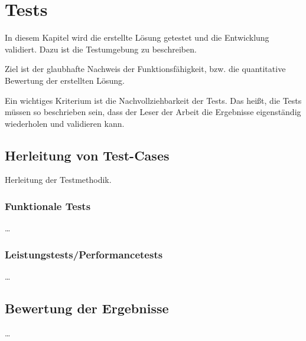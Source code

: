 
\chapter{Tests} \label{Tests}

In diesem Kapitel wird die erstellte Lösung getestet und die Entwicklung validiert.
Dazu ist die Testumgebung zu beschreiben. 

Ziel ist der glaubhafte Nachweis der Funktionsfähigkeit, bzw. die quantitative Bewertung
der erstellten Lösung. 

Ein wichtiges Kriterium ist die Nachvollziehbarkeit der Tests. Das heißt, die Tests müssen
so beschrieben sein, dass der Leser der Arbeit die Ergebnisse eigenständig wiederholen und
validieren kann.

\section{Herleitung von Test-Cases}
Herleitung der Testmethodik.

\subsection{Funktionale Tests}
\ldots
\subsection{Leistungstests/Performancetests}
\ldots
\section{Bewertung der Ergebnisse}
\ldots
